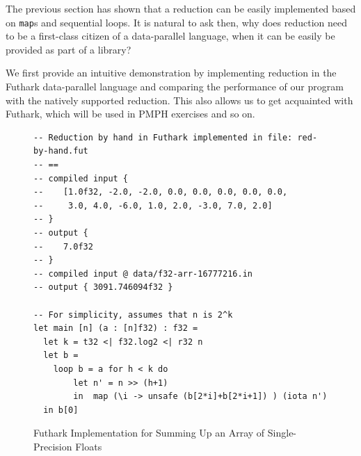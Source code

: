 \documentclass[acmsmall,review]{acmart}\settopmatter{printfolios=true,printccs=false,printacmref=false}
\begin{document}
The previous section has shown that a reduction can be easily
implemented based on \lstinline{map}s and sequential loops.
It is natural to ask then, why does reduction need to be a
first-class citizen of a data-parallel language, when it can
be easily be provided as part of a library? 

We first provide an intuitive demonstration by implementing
reduction in the Futhark data-parallel language and comparing
the performance of our program with the natively supported
reduction. This also allows us to get acquainted with Futhark,
which will be used in PMPH exercises and so on.

\begin{figure}
\begin{lstlisting}[mathescape=true]
-- Reduction by hand in Futhark implemented in file: red-by-hand.fut
-- ==
-- compiled input {
--    [1.0f32, -2.0, -2.0, 0.0, 0.0, 0.0, 0.0, 0.0, 
--     3.0, 4.0, -6.0, 1.0, 2.0, -3.0, 7.0, 2.0]
-- }
-- output {
--    7.0f32
-- }
-- compiled input @ data/f32-arr-16777216.in
-- output { 3091.746094f32 }

-- For simplicity, assumes that n is 2^k
let main [n] (a : [n]f32) : f32 =
  let k = t32 <| f32.log2 <| r32 n
  let b = 
    loop b = a for h < k do
        let n' = n >> (h+1)
        in  map (\i -> unsafe (b[2*i]+b[2*i+1]) ) (iota n')
  in b[0]
\end{lstlisting}\vspace{-4ex}
\caption{Futhark Implementation for Summing Up an Array of Single-Precision Floats}
\label{fig:futhark-red}
\end{figure}
\end{document}
